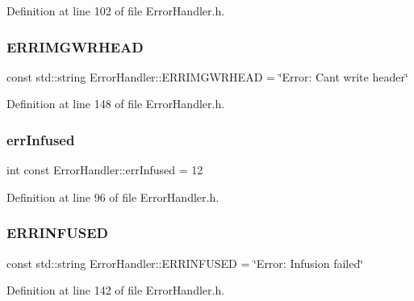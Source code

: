 Definition at line 102 of file Error\+Handler.\+h.

\mbox{\label{classErrorHandler_aaacdfc33d32a1f97a8a2704512fa4436}} 
\subsubsection{\texorpdfstring{ERRIMGWRHEAD}{ERRIMGWRHEAD}}
{\footnotesize\ttfamily const std\+::string Error\+Handler\+::\+E\+R\+R\+I\+M\+G\+W\+R\+H\+E\+AD = \char`\"{}Error\+: Can\textquotesingle{}t write header\char`\"{}\hspace{0.3cm}{\ttfamily [static]}}



Definition at line 148 of file Error\+Handler.\+h.

\mbox{\label{classErrorHandler_a6b02e9a761607b206e3b6f724d03ac29}} 
\subsubsection{\texorpdfstring{errInfused}{errInfused}}
{\footnotesize\ttfamily int const Error\+Handler\+::err\+Infused = 12\hspace{0.3cm}{\ttfamily [static]}}



Definition at line 96 of file Error\+Handler.\+h.

\mbox{\label{classErrorHandler_a8ee302ac7c97c484eb90c8e08fad3749}} 
\subsubsection{\texorpdfstring{ERRINFUSED}{ERRINFUSED}}
{\footnotesize\ttfamily const std\+::string Error\+Handler\+::\+E\+R\+R\+I\+N\+F\+U\+S\+ED = \char`\"{}Error\+: Infusion failed\char`\"{}\hspace{0.3cm}{\ttfamily [static]}}



Definition at line 142 of file Error\+Handler.\+h.

